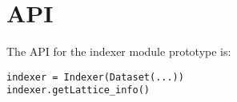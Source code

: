 \documentclass[a4paper, 11pt]{article}
\begin{document}
\section{API}

The API for the indexer module prototype is:

{
\tiny
\begin{verbatim}
indexer = Indexer(Dataset(...))
indexer.getLattice_info()
\end{verbatim}
}
\end{document}
